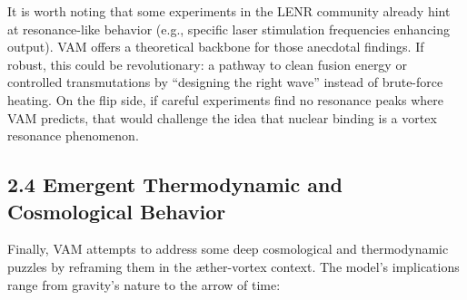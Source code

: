 \documentclass[a4paper,12pt]{article}
\begin{document}
It is worth noting that some experiments in the LENR community already hint at resonance-like behavior (e.g., specific laser stimulation frequencies enhancing output). VAM offers a theoretical backbone for those anecdotal findings. If robust, this could be revolutionary: a pathway to clean fusion energy or controlled transmutations by ``designing the right wave'' instead of brute-force heating. On the flip side, if careful experiments find no resonance peaks where VAM predicts, that would challenge the idea that nuclear binding is a vortex resonance phenomenon.


\subsection*{2.4 Emergent Thermodynamic and Cosmological Behavior}

Finally, VAM attempts to address some deep cosmological and thermodynamic puzzles by reframing them in the æther-vortex context. The model’s implications range from gravity’s nature to the arrow of time:
\end{document}
